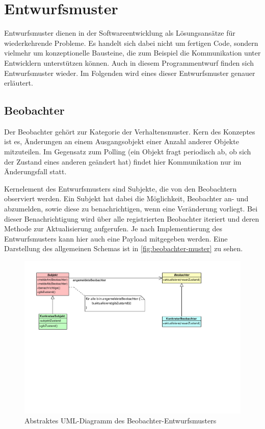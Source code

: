 \chapter{Entwurfsmuster}
Entwurfsmuster dienen in der Softwareentwicklung als Lösungsansätze für wiederkehrende Probleme.
Es handelt sich dabei nicht um fertigen Code, sondern vielmehr um konzeptionelle Bausteine, die zum Beispiel die Kommunikation unter Entwicklern unterstützen können.
Auch in diesem Programmentwurf finden sich Entwurfsmuster wieder.
Im Folgenden wird eines dieser Entwurfsmuster genauer erläutert.

\section{Beobachter}
Der Beobachter gehört zur Kategorie der Verhaltensmuster.
Kern des Konzeptes ist es, Änderungen an einem Ausgangsobjekt einer Anzahl anderer Objekte mitzuteilen.
Im Gegensatz zum Polling (ein Objekt fragt periodisch ab, ob sich der Zustand eines anderen geändert hat) findet hier Kommunikation nur im Änderungsfall statt.

Kernelement des Entwurfsmusters sind Subjekte, die von den Beobachtern observiert werden.
Ein Subjekt hat dabei die Möglichkeit, Beobachter an- und abzumelden, sowie diese zu benachrichtigen, wenn eine Veränderung vorliegt.
Bei dieser Benachrichtigung wird über alle registrierten Beobachter iteriert und deren Methode zur Aktualisierung aufgerufen.
Je nach Implementierung des Entwurfsmusters kann hier auch eine Payload mitgegeben werden.
Eine Darstellung des allgemeinen Schemas ist in \autoref{fig:beobachter-muster} zu sehen.

\begin{figure}
    \centering
    \includegraphics[width=\textwidth, trim = 0cm 10cm 3.5cm 0cm]{../VPP/Beobachter-Muster.pdf}
    \caption{Abstraktes UML-Diagramm des Beobachter-Entwurfsmusters}
    \label{fig:beobachter-muster}
\end{figure}

